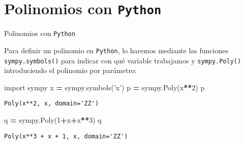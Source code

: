 \documentclass[
  ignorenonframetext,
]{beamer}
\newenvironment{Shaded}{\begin{snugshade}}{\end{snugshade}}
\newcommand{\DecValTok}[1]{\textcolor[rgb]{0.00,0.00,0.81}{#1}}
\newcommand{\ImportTok}[1]{#1}
\newcommand{\NormalTok}[1]{#1}
\newcommand{\OperatorTok}[1]{\textcolor[rgb]{0.81,0.36,0.00}{\textbf{#1}}}
\newcommand{\StringTok}[1]{\textcolor[rgb]{0.31,0.60,0.02}{#1}}
\begin{document}
\hypertarget{polinomios-con-python}{%
\section{\texorpdfstring{Polinomios con
\texttt{Python}}{Polinomios con Python}}\label{polinomios-con-python}}

\begin{frame}[fragile]{Polinomios con \texttt{Python}}
\protect\hypertarget{polinomios-con-python-1}{}

Para definir un polinomio en \texttt{Python}, lo haremos mediante las
funciones \texttt{sympy.symbols()} para indicar con qué variable
trabajamos y \texttt{sympy.Poly()} introduciendo el polinomio por
parámetro:

\begin{Shaded}
\begin{Highlighting}[]
\ImportTok{import}\NormalTok{ sympy }
\NormalTok{x }\OperatorTok{=}\NormalTok{ sympy.symbols(}\StringTok{'x'}\NormalTok{) }
\NormalTok{p }\OperatorTok{=}\NormalTok{ sympy.Poly(x}\OperatorTok{**}\DecValTok{2}\NormalTok{) }
\NormalTok{p}
\end{Highlighting}
\end{Shaded}

\begin{verbatim}
Poly(x**2, x, domain='ZZ')
\end{verbatim}

\begin{Shaded}
\begin{Highlighting}[]
\NormalTok{q }\OperatorTok{=}\NormalTok{ sympy.Poly(}\DecValTok{1}\OperatorTok{+}\NormalTok{x}\OperatorTok{+}\NormalTok{x}\OperatorTok{**}\DecValTok{3}\NormalTok{) }
\NormalTok{q}
\end{Highlighting}
\end{Shaded}

\begin{verbatim}
Poly(x**3 + x + 1, x, domain='ZZ')
\end{verbatim}

\end{frame}
\end{document}
